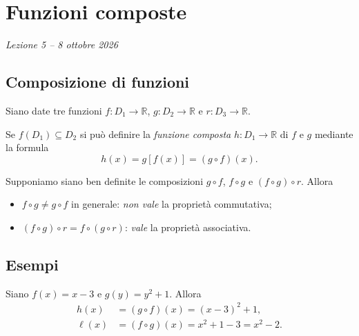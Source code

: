 \documentclass[11pt,a4paper]{article}
\begin{document}
\section[Funzioni composte (Lezione 5 -- 8 ottobre 2026)]{Funzioni composte}
\noindent\emph{Lezione 5 -- 8 ottobre 2026}
\subsection{Composizione di funzioni}

Siano date tre funzioni $f : D_1 \to \mathbb{R}$, $g : D_2 \to \mathbb{R}$ e $r : D_3 \to \mathbb{R}$.

\begin{definizione}
Se $f(D_1) \subseteq D_2$ si può definire la \emph{funzione composta} $h : D_1 \to \mathbb{R}$ di $f$ e $g$ mediante la formula
\[
h(x) = g[f(x)] = (g \circ f)(x).
\]
\end{definizione}

Supponiamo siano ben definite le composizioni $g \circ f$, $f \circ g$ e $(f \circ g) \circ r$. Allora
\begin{itemize}
    \item $f \circ g \neq g \circ f$ in generale: \emph{non vale} la proprietà commutativa;
    \item $(f \circ g) \circ r = f \circ (g \circ r)$: \emph{vale} la proprietà associativa.
\end{itemize}

\subsection{Esempi}

\begin{esempio}
Siano $f(x) = x - 3$ e $g(y) = y^2 + 1$. Allora
\begin{align*}
h(x) &= (g \circ f)(x) = (x - 3)^2 + 1, \\
\ell(x) &= (f \circ g)(x) = x^2 + 1 - 3 = x^2 - 2.
\end{align*}
\end{esempio}
\end{document}
